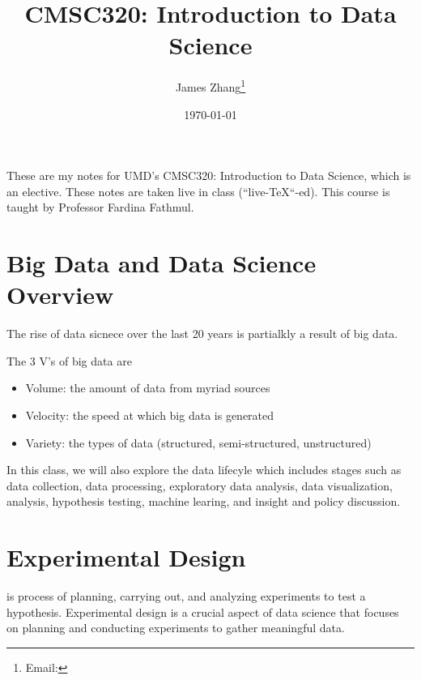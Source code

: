 \documentclass[12pt]{scrartcl}
\begin{document}
\title{CMSC320: Introduction to Data Science}
\author{James Zhang\thanks{Email: }}
\date{\today}



\maketitle
    These are my notes for UMD's CMSC320: Introduction to Data Science, which is an
    elective. These notes are taken live in class (``live-\TeX``-ed). 
    This course is taught by Professor Fardina Fathmul. 
\tableofcontents
\newpage

\section{Big Data and Data Science Overview}

The rise of data sicnece over the last 20 years is partialkly a result of big data. 

The 3 V's of big data are 
\begin{itemize}
  \item Volume: the amount of data from myriad sources
  \item Velocity: the speed at which big data is generated
  \item Variety: the types of data (structured, semi-structured, unstructured)
\end{itemize}

In this class, we will also explore the data lifecyle which includes stages such as 
data collection, data processing, exploratory data analysis, data visualization, analysis, hypothesis testing, 
machine learing, and insight and policy discussion.

\section{Experimental Design}

\begin{definition}
   is process of planning, carrying out, and analyzing experiments 
  to test a hypothesis.
  Experimental design is a crucial aspect of data science that focuses on 
  planning and conducting experiments to gather meaningful data.
\end{definition}
\end{document}
